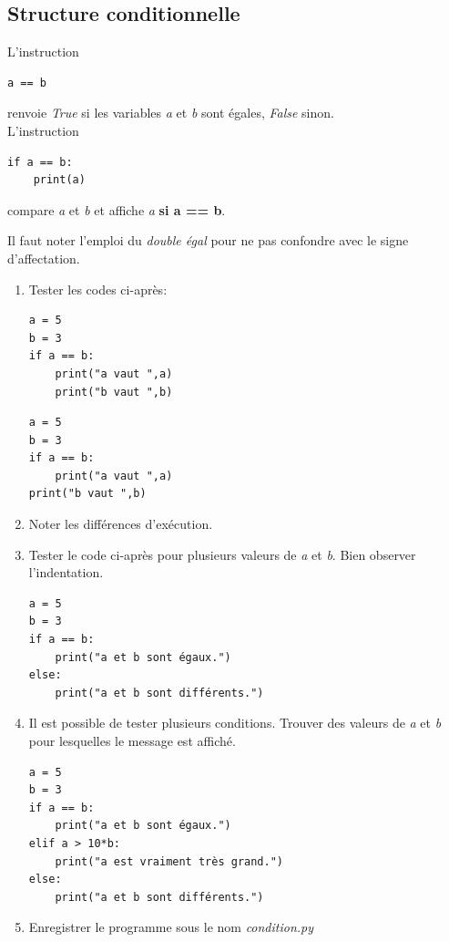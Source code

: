\documentclass[a4paper,11pt]{article}
\begin{document}
\begin{Form}
\subsection{Structure conditionnelle}
L'instruction
\begin{lstlisting}
a == b
\end{lstlisting}
renvoie \emph{True} si les variables \emph{a} et \emph{b} sont égales, \emph{False} sinon. 
\\
L'instruction
\begin{lstlisting}
if a == b:
    print(a)
\end{lstlisting}
compare \emph{a} et \emph{b} et affiche \emph{a} \textbf{si a == b}.
\begin{aretenir}
Il faut noter l'emploi du \emph{double égal} pour ne pas confondre avec le signe d'affectation.
\end{aretenir}
\begin{activite}
\begin{enumerate}
\item Tester les codes ci-après:
\begin{lstlisting}
a = 5
b = 3
if a == b:
    print("a vaut ",a)
    print("b vaut ",b)
\end{lstlisting}
\begin{lstlisting}
a = 5
b = 3
if a == b:
    print("a vaut ",a)
print("b vaut ",b)
\end{lstlisting}
\item Noter les différences d'exécution.
\item Tester le code ci-après pour plusieurs valeurs de \emph{a} et \emph{b}. Bien observer l'indentation.
\begin{lstlisting}
a = 5
b = 3
if a == b:
    print("a et b sont égaux.")
else:
    print("a et b sont différents.")
\end{lstlisting}
\item Il est possible de tester plusieurs conditions. Trouver des valeurs de \emph{a} et \emph{b} pour lesquelles le message  est affiché.
\begin{lstlisting}
a = 5
b = 3
if a == b:
    print("a et b sont égaux.")
elif a > 10*b:
    print("a est vraiment très grand.")
else:
    print("a et b sont différents.")
\end{lstlisting}
\item Enregistrer le programme sous le nom \emph{condition.py}
\end{enumerate}
\end{activite}

\end{Form}
\end{document}

